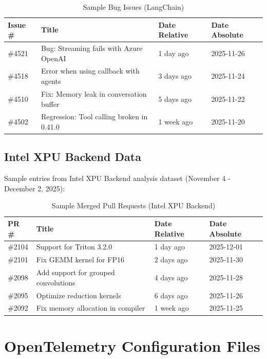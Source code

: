 \begin{table}[H]
\centering
\caption{Sample Bug Issues (LangChain)}
\label{tab:langchain-sample-issues}
\small
\begin{tabular}{@{}llll@{}}
\toprule
\textbf{Issue \#} & \textbf{Title} & \textbf{Date Relative} & \textbf{Date Absolute} \\ \midrule
\#4521 & Bug: Streaming fails with Azure OpenAI & 1 day ago & 2025-11-26 \\
\#4518 & Error when using callback with agents & 3 days ago & 2025-11-24 \\
\#4510 & Fix: Memory leak in conversation buffer & 5 days ago & 2025-11-22 \\
\#4502 & Regression: Tool calling broken in 0.41.0 & 1 week ago & 2025-11-20 \\ \bottomrule
\end{tabular}
\end{table}

\subsection{Intel XPU Backend Data}

Sample entries from Intel XPU Backend analysis dataset (November 4 - December 2, 2025):

\begin{table}[H]
\centering
\caption{Sample Merged Pull Requests (Intel XPU Backend)}
\label{tab:intel-sample-prs}
\small
\begin{tabular}{@{}llll@{}}
\toprule
\textbf{PR \#} & \textbf{Title} & \textbf{Date Relative} & \textbf{Date Absolute} \\ \midrule
\#2104 & Support for Triton 3.2.0 & 1 day ago & 2025-12-01 \\
\#2101 & Fix GEMM kernel for FP16 & 2 days ago & 2025-11-30 \\
\#2098 & Add support for grouped convolutions & 4 days ago & 2025-11-28 \\
\#2095 & Optimize reduction kernels & 6 days ago & 2025-11-26 \\
\#2092 & Fix memory allocation in compiler & 1 week ago & 2025-11-25 \\ \bottomrule
\end{tabular}
\end{table}

\section{OpenTelemetry Configuration Files}

